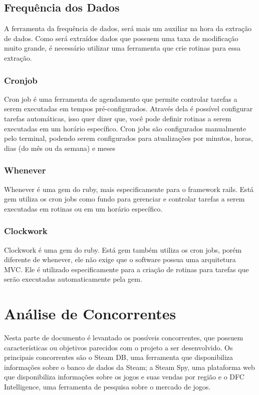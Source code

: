 \subsection{Frequência dos Dados}
A ferramenta da frequência de dados, será mais um auxiliar na hora da extração de dados. Como será extraídos dados que possuem uma taxa de modificação muito grande, é necessário utilizar uma ferramenta que crie rotinas para essa extração.
\subsubsection*{Cronjob}
Cron job é uma ferramenta de agendamento que permite controlar tarefas a serem executadas em tempos pré-configurados. Através dela é possível configurar tarefas automáticas, isso quer dizer que, você pode definir rotinas a serem executadas em um horário específico. Cron jobs são configurados manualmente pelo terminal, podendo serem configurados para atualizações por minutos, horas, dias (do mês ou da semana) e meses
\subsubsection*{Whenever}
Whenever é uma gem do ruby, mais especificamente para o framework rails. Está gem utiliza os cron jobs como fundo para gerenciar e controlar tarefas a serem executadas em rotinas ou em um horário específico\cite{whenever}.
\subsubsection*{Clockwork}
Clockwork é uma gem do ruby. Está gem também utiliza os cron jobs, porém diferente de whenever, ele não exige que o software possua uma arquitetura MVC. Ele é utilizado especificamente para a criação de rotinas para tarefas que serão executadas automaticamente pela gem\cite{clockwork}.
\section{Análise de Concorrentes}
Nesta parte de documento é levantado os possíveis concorrentes, que possuem características ou objetivos parecidos com o projeto a ser desenvolvido. Os principais concorrentes são o Steam DB, uma ferramenta que disponibiliza informações sobre o banco de dados da Steam; a Steam Spy, uma plataforma web que disponibiliza informações sobre os jogos e suas vendas por região e o DFC Intelligence, uma ferramenta de pesquisa sobre o mercado de jogos.
